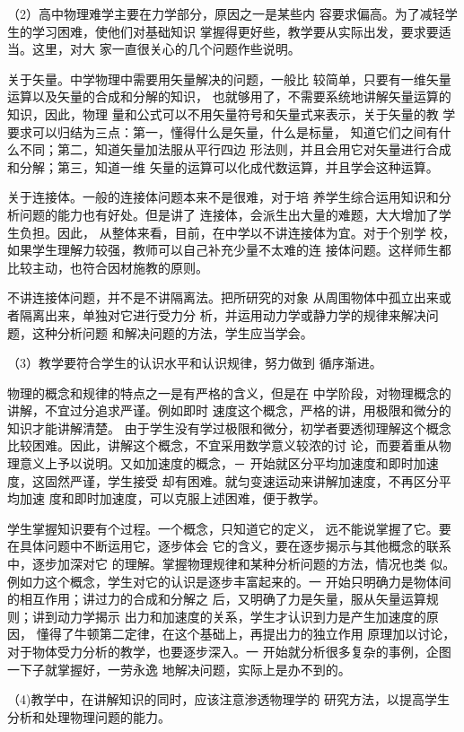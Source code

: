 （2）高中物理难学主要在力学部分，原因之一是某些内
容要求偏高。为了减轻学生的学习困难，使他们对基础知识
掌握得更好些，教学要从实际出发，要求要适当。这里，对大
家一直很关心的几个问题作些说明。

关于矢量。中学物理中需要用矢量解决的问题，一般比
较简单，只要有一维矢量运算以及矢量的合成和分解的知识，
也就够用了，不需要系统地讲解矢量运算的知识，因此，物理
量和公式可以不用矢量符号和矢量式来表示，关于矢量的教
学要求可以归结为三点：第一，懂得什么是矢量，什么是标量，
知道它们之间有什么不同；第二，知道矢量加法服从平行四边
形法则，并且会用它对矢量进行合成和分解；第三，知道一维
矢量的运算可以化成代数运算，并且学会这种运算。

关于连接体。一般的连接体问题本来不是很难，对于培
养学生综合运用知识和分析问题的能力也有好处。但是讲了
连接体，会派生出大量的难题，大大增加了学生负担。因此，
从整体来看，目前，在中学以不讲连接体为宜。对于个别学
校，如果学生理解力较强，教师可以自己补充少量不太难的连
接体问题。这样师生都比较主动，也符合因材施教的原则。

不讲连接体问题，并不是不讲隔离法。把所研究的对象
从周围物体中孤立出来或者隔离出来，单独对它进行受力分
析，并运用动力学或静力学的规律来解决问题，这种分析问题
和解决问题的方法，学生应当学会。

（3）教学要符合学生的认识水平和认识规律，努力做到
循序渐进。

物理的概念和规律的特点之一是有严格的含义，但是在
中学阶段，对物理概念的讲解，不宜过分追求严谨。例如即时
速度这个概念，严格的讲，用极限和微分的知识才能讲解清楚。
由于学生没有学过极限和微分，初学者要透彻理解这个概念
比较困难。因此，讲解这个概念，不宜采用数学意义较浓的讨
论，而要着重从物理意义上予以说明。又如加速度的概念，－
开始就区分平均加速度和即时加速度，这固然严谨，学生接受
却有困难。就匀变速运动来讲解加速度，不再区分平均加速
度和即时加速度，可以克服上述困难，便于教学。

学生掌握知识要有个过程。一个概念，只知道它的定义，
远不能说掌握了它。要在具体问题中不断运用它，逐步体会
它的含义，要在逐步揭示与其他概念的联系中，逐步加深对它
的理解。掌握物理规律和某种分析问题的方法，情况也类
似。例如力这个概念，学生对它的认识是逐步丰富起来的。一
开始只明确力是物体间的相互作用；讲过力的合成和分解之
后，又明确了力是矢量，服从矢量运算规则；讲到动力学揭示
出力和加速度的关系，学生才认识到力是产生加速度的原因，
懂得了牛顿第二定律，在这个基础上，再提出力的独立作用
原理加以讨论，对于物体受力分析的教学，也要逐步深入。一
开始就分析很多复杂的事例，企图一下子就掌握好，一劳永逸
地解决问题，实际上是办不到的。

（4)教学中，在讲解知识的同时，应该注意渗透物理学的
研究方法，以提高学生分析和处理物理问题的能力。

